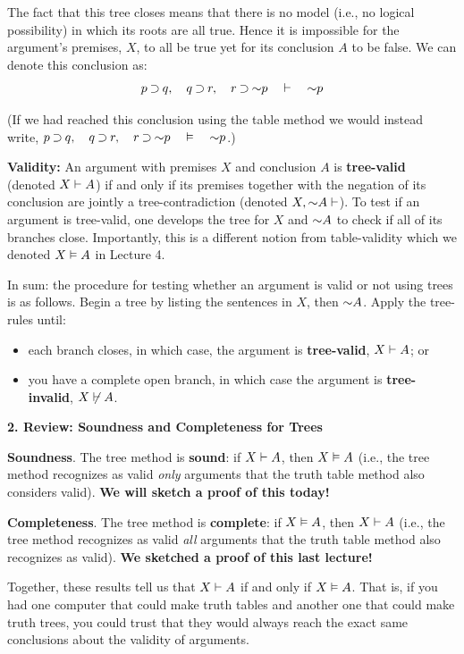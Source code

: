\documentclass[options]{philosophersimprint}
\begin{document}
The fact that this tree closes means that there is no model (i.e., no logical possibility) in which its roots are all true. Hence it is impossible for the argument's premises, $X$, to all be true yet for its conclusion $A$ to be false. We can denote this conclusion as:
$$p\mathbin{\supset} q, \quad q\mathbin{\supset} r, \quad r\mathbin{\supset} \mathord{\sim} p \quad \vdash \quad \mathord{\sim} p$$

(If we had reached this conclusion using the table method we would instead write, $p\mathbin{\supset} q, \quad q\mathbin{\supset} r, \quad r\mathbin{\supset} \mathord{\sim} p \quad \vDash \quad \mathord{\sim} p$.)

\textbf{Validity:} An argument with premises $X$ and conclusion $A$ is \textbf{tree-valid} (denoted $X \vdash A$) if and only if its premises together with the negation of its conclusion are jointly a tree-contradiction (denoted $X,\mathord{\sim} A\vdash$). To test if an argument is tree-valid, one develops the tree for $X$ and $\mathord{\sim} A$ to check if all of its branches close. Importantly, this is a different notion from table-validity which we denoted $X \vDash A$ in Lecture 4.

In sum: the procedure for testing whether an argument is valid or not using trees is as follows. Begin a tree by listing the sentences in $X$, then $\mathord{\sim} A$. Apply the tree-rules until:
\begin{itemize}
    \item each branch closes, in which case, the argument is \textbf{tree-valid}, $X \vdash A$; or
    \item you have a complete open branch, in which case the argument is \textbf{tree-invalid}, $X \not\vdash A$.
\end{itemize}

\textbf{2. Review: Soundness and Completeness for Trees}

\textbf{Soundness}. The tree method is \textbf{sound}: if $X \vdash A$, then $X \vDash A$ (i.e., the tree method recognizes as valid \textit{only} arguments that the truth table method also considers valid). \textbf{We will sketch a proof of this today!}

\textbf{Completeness}. The tree method is \textbf{complete}: if $X \vDash A$, then $X \vdash A$ (i.e., the tree method recognizes as valid \textit{all} arguments that the truth table method also recognizes as valid). \textbf{We sketched a proof of this last lecture!}

Together, these results tell us that $X \vdash A$ if and only if $X \vDash A$. That is, if you had one computer that could make truth tables and another one that could make truth trees, you could trust that they would always reach the exact same conclusions about the validity of arguments.
\end{document}
